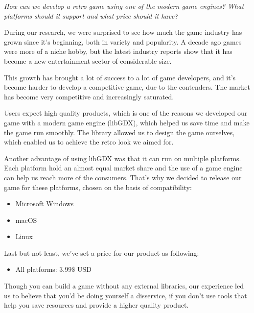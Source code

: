 \documentclass[12p]{article}
\begin{document}
\textit{How can we develop a retro game using one of the modern game engines? What platforms should it support and what price should it have?}

During our research, we were surprised to see how much the game industry has grown since it's beginning, both in variety and popularity. A decade ago games were more of a niche hobby, but the latest industry reports show that it has become a new entertainment sector of considerable size.

This growth has brought a lot of success to a lot of game developers, and it's become harder to develop a competitive game, due to the contenders. The market has become very competitive and increasingly saturated.

Users expect high quality products, which is one of the reasons we developed our game with a modern game engine (libGDX), which helped us save time and make the game run smoothly. The library allowed us to design the game ourselves, which enabled us to achieve the retro look we aimed for.

Another advantage of using libGDX was that it can run on multiple platforms. Each platform hold an almost equal market share and the use of a game engine can help us reach more of the consumers. That's why we decided to release our game for these platforms, chosen on the basis of compatibility:

\begin{itemize}
  \item Microsoft Windows
  \item macOS
  \item Linux
\end{itemize}

Last but not least, we've set a price for our product as following: 

\begin{itemize}
 \item All platforms: 3.99\$ USD
\end{itemize}

Though you can build a game without any external libraries, our experience led us to believe that you'd be doing yourself a disservice, if you don't use tools that help you save resources and provide a higher quality product.


\newpage
\printbibliography[heading=bibintoc,title={References}]
\end{document}
